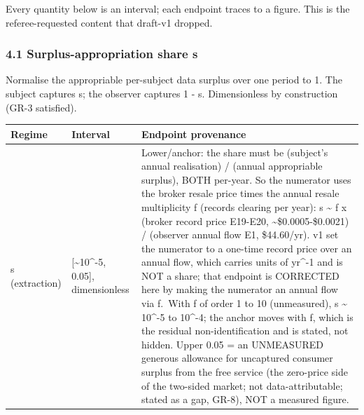 \documentclass[
  11pt,
]{article}
\newcounter{none} %
\begin{document}
Every quantity below is an interval; each endpoint traces to a figure.
This is the referee-requested content that draft-v1 dropped.

\subsubsection{4.1 Surplus-appropriation share
s}\label{surplus-appropriation-share-s}

Normalise the appropriable per-subject data surplus over one period to
1. The subject captures s; the observer captures 1 - s. Dimensionless by
construction (GR-3 satisfied).

{\def\LTcaptype{none} %
\begin{longtable}[]{@{}
  >{\raggedright\arraybackslash}p{}
  >{\raggedright\arraybackslash}p{}
  >{\raggedright\arraybackslash}p{}@{}}
\toprule\noalign{}
\begin{minipage}[b]{\linewidth}\raggedright
Regime
\end{minipage} & \begin{minipage}[b]{\linewidth}\raggedright
Interval
\end{minipage} & \begin{minipage}[b]{\linewidth}\raggedright
Endpoint provenance
\end{minipage} \\
\midrule\noalign{}
\endhead
\bottomrule\noalign{}
\endlastfoot
s (extraction) & {[}\textasciitilde10\^{}-5, 0.05{]}, dimensionless &
Lower/anchor: the share must be (subject's annual realisation) / (annual
appropriable surplus), BOTH per-year. So the numerator uses the broker
resale price times the annual resale multiplicity f (records clearing
per year): s \textasciitilde{} f x (broker record price E19-E20,
\textasciitilde\$0.0005-\$0.0021) / (observer annual flow E1,
\$44.60/yr). v1 set the numerator to a one-time record price over an
annual flow, which carries units of yr\^{}-1 and is NOT a share; that
endpoint is CORRECTED here by making the numerator an annual flow via
f.~With f of order 1 to 10 (unmeasured), s \textasciitilde{} 10\^{}-5 to
10\^{}-4; the anchor moves with f, which is the residual
non-identification and is stated, not hidden. Upper 0.05 = an UNMEASURED
generous allowance for uncaptured consumer surplus from the free service
(the zero-price side of the two-sided market; not data-attributable;
stated as a gap, GR-8), NOT a measured figure. \\

\end{longtable}}
\end{document}
